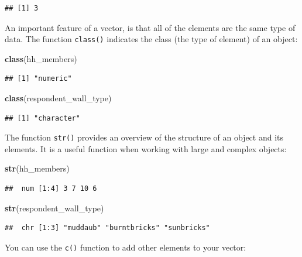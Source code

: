 \documentclass[]{book}
\newenvironment{Shaded}{\begin{snugshade}}{\end{snugshade}}
\newcommand{\KeywordTok}[1]{\textcolor[rgb]{0.13,0.29,0.53}{\textbf{#1}}}
\newcommand{\NormalTok}[1]{#1}
\begin{document}
\begin{verbatim}
## [1] 3
\end{verbatim}

An important feature of a vector, is that all of the elements are the
same type of data. The function \texttt{class()} indicates the class
(the type of element) of an object:

\begin{Shaded}
\begin{Highlighting}[]
\KeywordTok{class}\NormalTok{(hh_members)}
\end{Highlighting}
\end{Shaded}

\begin{verbatim}
## [1] "numeric"
\end{verbatim}

\begin{Shaded}
\begin{Highlighting}[]
\KeywordTok{class}\NormalTok{(respondent_wall_type)}
\end{Highlighting}
\end{Shaded}

\begin{verbatim}
## [1] "character"
\end{verbatim}

The function \texttt{str()} provides an overview of the structure of an
object and its elements. It is a useful function when working with large
and complex objects:

\begin{Shaded}
\begin{Highlighting}[]
\KeywordTok{str}\NormalTok{(hh_members)}
\end{Highlighting}
\end{Shaded}

\begin{verbatim}
##  num [1:4] 3 7 10 6
\end{verbatim}

\begin{Shaded}
\begin{Highlighting}[]
\KeywordTok{str}\NormalTok{(respondent_wall_type)}
\end{Highlighting}
\end{Shaded}

\begin{verbatim}
##  chr [1:3] "muddaub" "burntbricks" "sunbricks"
\end{verbatim}

You can use the \texttt{c()} function to add other elements to your
vector:
\end{document}
